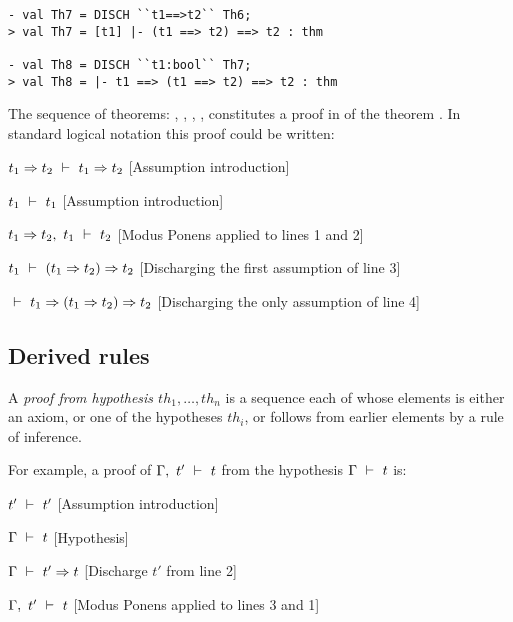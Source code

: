 \begin{session}\begin{verbatim}
- val Th7 = DISCH ``t1==>t2`` Th6;
> val Th7 = [t1] |- (t1 ==> t2) ==> t2 : thm

- val Th8 = DISCH ``t1:bool`` Th7;
> val Th8 = |- t1 ==> (t1 ==> t2) ==> t2 : thm
\end{verbatim}\end{session}

    The sequence of theorems: , , , ,
     constitutes a proof in \HOL{} of the theorem . In standard logical notation this proof
    could be written:

\begin{proofenumerate}
\item $ t_1\Rightarrow t_2\ \vdash\  t_1\Rightarrow t_2$ \hfill
[Assumption introduction]
\item $ t_1\ \vdash\  t_1$ \hfill
[Assumption introduction]
\item $ t_1\Rightarrow t_2,\ t_1 \ \vdash\  t_2 $ \hfill
[Modus Ponens applied to lines 1 and 2]
\item $ t_1 \ \vdash\  (t_1\Rightarrow t_2)\Rightarrow t_2$ \hfill
[Discharging the first assumption of line 3]
\item $ \ \vdash\  t_1 \Rightarrow (t_1 \Rightarrow t_2) \Rightarrow t_2$ \hfill
[Discharging the only assumption of line 4]
\end{proofenumerate}

\subsection{Derived rules}


A {\it proof from hypothesis $th_1, \ldots, th_n$} is a sequence each
of whose elements is either an axiom, or one of the hypotheses $th_i$,
or follows from earlier elements by a rule of inference.

For example, a proof of $\Gamma,\ t'\ \vdash\  t$ from the hypothesis
$\Gamma\ \vdash\  t$ is:


\begin{proofenumerate}
\item $ t'\ \vdash\  t'$ \hfill [Assumption introduction]
\item $ \Gamma\ \vdash\  t$ \hfill [Hypothesis]
\item $ \Gamma\ \vdash\  t'\Rightarrow t$ \hfill [Discharge $t'$ from line 2]
\item $ \Gamma,\ t'\ \vdash\  t$ \hfill [Modus Ponens applied to lines 3 and 1]
\end{proofenumerate}


